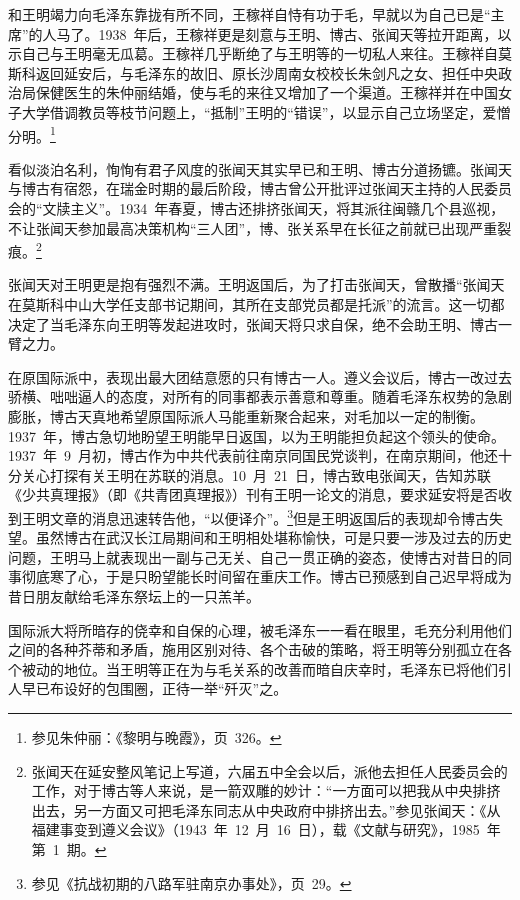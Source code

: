 和王明竭力向毛泽东靠拢有所不同，王稼祥自恃有功于毛，早就以为自己已是“主席”的人马了。1938~年后，王稼祥更是刻意与王明、博古、张闻天等拉开距离，以示自己与王明毫无瓜葛。王稼祥几乎断绝了与王明等的一切私人来往。王稼祥自莫斯科返回延安后，与毛泽东的故旧、原长沙周南女校校长朱剑凡之女、担任中央政治局保健医生的朱仲丽结婚，使与毛的来往又增加了一个渠道。王稼祥并在中国女子大学借调教员等枝节问题上，“抵制”王明的“错误”，以显示自己立场坚定，爱憎分明。\footnote{参见朱仲丽：《黎明与晚霞》，页~326。}

看似淡泊名利，恂恂有君子风度的张闻天其实早已和王明、博古分道扬镳。张闻天与博古有宿怨，在瑞金时期的最后阶段，博古曾公开批评过张闻天主持的人民委员会的“文牍主义”。1934~年春夏，博古还排挤张闻天，将其派往闽赣几个县巡视，不让张闻天参加最高决策机构“三人团”，博、张关系早在长征之前就已出现严重裂痕。\footnote{张闻天在延安整风笔记上写道，六届五中全会以后，派他去担任人民委员会的工作，对于博古等人来说，是一箭双雕的妙计：“一方面可以把我从中央排挤出去，另一方面又可把毛泽东同志从中央政府中排挤出去。”参见张闻天：《从福建事变到遵义会议》（1943~年~12~月~16~日），载《文献与研究》，1985~年第~1~期。}

张闻天对王明更是抱有强烈不满。王明返国后，为了打击张闻天，曾散播“张闻天在莫斯科中山大学任支部书记期间，其所在支部党员都是托派”的流言。这一切都决定了当毛泽东向王明等发起进攻时，张闻天将只求自保，绝不会助王明、博古一臂之力。

在原国际派中，表现出最大团结意愿的只有博古一人。遵义会议后，博古一改过去骄横、咄咄逼人的态度，对所有的同事都表示善意和尊重。随着毛泽东权势的急剧膨胀，博古天真地希望原国际派人马能重新聚合起来，对毛加以一定的制衡。1937~年，博古急切地盼望王明能早日返国，以为王明能担负起这个领头的使命。1937~年~9~月初，博古作为中共代表前往南京同国民党谈判，在南京期间，他还十分关心打探有关王明在苏联的消息。10~月~21~日，博古致电张闻天，告知苏联《少共真理报》（即《共青团真理报》）刊有王明一论文的消息，要求延安将是否收到王明文章的消息迅速转告他，“以便译介”。\footnote{参见《抗战初期的八路军驻南京办事处》，页~29。}但是王明返国后的表现却令博古失望。虽然博古在武汉长江局期间和王明相处堪称愉快，可是只要一涉及过去的历史问题，王明马上就表现出一副与己无关、自己一贯正确的姿态，使博古对昔日的同事彻底寒了心，于是只盼望能长时间留在重庆工作。博古已预感到自己迟早将成为昔日朋友献给毛泽东祭坛上的一只羔羊。

国际派大将所暗存的侥幸和自保的心理，被毛泽东一一看在眼里，毛充分利用他们之间的各种芥蒂和矛盾，施用区别对待、各个击破的策略，将王明等分别孤立在各个被动的地位。当王明等正在为与毛关系的改善而暗自庆幸时，毛泽东已将他们引人早已布设好的包围圈，正待一举“歼灭”之。


